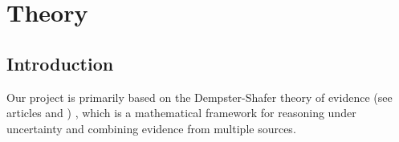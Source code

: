\chapter{Theory}

\section{Introduction}

Our project is primarily based on the Dempster-Shafer theory of evidence
(see articles \cite{2.5D_Evidential_Grids_for_Dynamic_Object_Detection} and \cite{Cloud_Update_of_Tiled_Evidential_Occupancy_Grid_Maps_for_the_Multi_Vehicle_Mapping})
, which is a mathematical framework for reasoning under uncertainty and combining evidence from multiple sources.







